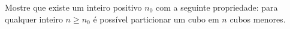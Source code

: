 Mostre que existe um inteiro positivo $n_0$ com a seguinte propriedade: para qualquer inteiro $n \ge n_0$ é possível particionar um cubo em $n$ cubos menores.